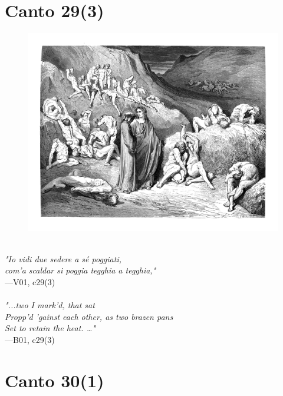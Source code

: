 \documentclass[../Dore_vision.tex]{subfiles}
\begin{document}
\newpage

\section{Canto 29(3)}

\begin{figure}[ht]
\centering
\includegraphics[height=\figsize]{illustrations/book_1/V01, c29(3).jpg}
\end{figure}

\begin{center}
\begin{minipage}{0.8\linewidth}
\textit{\\
"Io vidi due sedere a sé poggiati,\\com’a scaldar si poggia tegghia a tegghia,"} \\
—V01, c29(3) \\~\\
\textit{"...two I mark'd, that sat\\Propp'd 'gainst each other, as two brazen pans\\Set to retain the heat. …"} \\
—B01, c29(3)
\end{minipage}
\end{center}

\newpage

\section{Canto 30(1)}
\end{document}
